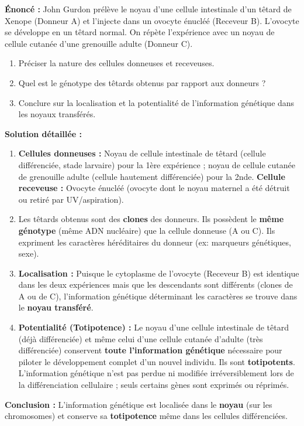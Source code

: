\documentclass[11pt]{article}
\begin{document}
\begin{exoresolu}
\textbf{Énoncé :} John Gurdon prélève le noyau d'une cellule intestinale d'un têtard de Xenope (Donneur A) et l'injecte dans un ovocyte énucléé (Receveur B). L'ovocyte se développe en un têtard normal. On répète l'expérience avec un noyau de cellule cutanée d'une grenouille adulte (Donneur C). 
\begin{enumerate}
    \item Préciser la nature des cellules donneuses et receveuses.
    \item Quel est le génotype des têtards obtenus par rapport aux donneurs ?
    \item Conclure sur la localisation et la potentialité de l'information génétique dans les noyaux transférés.
\end{enumerate}
\tcblower
\textbf{Solution détaillée :}
\begin{enumerate}
    \item \textbf{Cellules donneuses :} Noyau de cellule intestinale de têtard (cellule différenciée, stade larvaire) pour la 1ère expérience ; noyau de cellule cutanée de grenouille adulte (cellule hautement différenciée) pour la 2nde. \textbf{Cellule receveuse :} Ovocyte énucléé (ovocyte dont le noyau maternel a été détruit ou retiré par UV/aspiration).
    \item Les têtards obtenus sont des \textbf{clones} des donneurs. Ils possèdent le \textbf{même génotype} (même ADN nucléaire) que la cellule donneuse (A ou C). Ils expriment les caractères héréditaires du donneur (ex: marqueurs génétiques, sexe).
    \item \textbf{Localisation :} Puisque le cytoplasme de l'ovocyte (Receveur B) est identique dans les deux expériences mais que les descendants sont différents (clones de A ou de C), l'information génétique déterminant les caractères se trouve dans le \textbf{noyau transféré}.
    \item \textbf{Potentialité (Totipotence) :} Le noyau d'une cellule intestinale de têtard (déjà différenciée) et même celui d'une cellule cutanée d'adulte (très différenciée) conservent \textbf{toute l'information génétique} nécessaire pour piloter le développement complet d'un nouvel individu. Ils sont \textbf{totipotents}. L'information génétique n'est pas perdue ni modifiée irréversiblement lors de la différenciation cellulaire ; seuls certains gènes sont exprimés ou réprimés.
\end{enumerate}
\textbf{Conclusion :} L'information génétique est localisée dans le \textbf{noyau} (sur les chromosomes) et conserve sa \textbf{totipotence} même dans les cellules différenciées.
\end{exoresolu}
\end{document}
